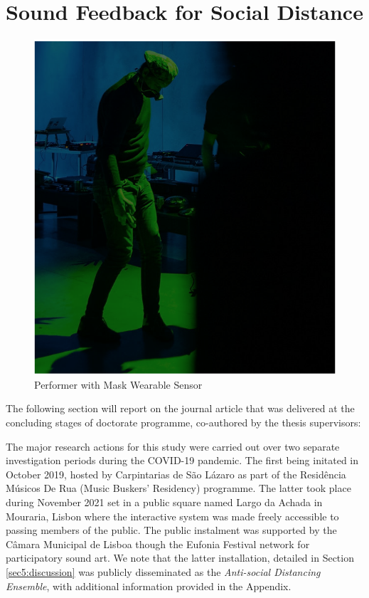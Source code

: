 
\section{Sound Feedback for Social Distance}
\label{case_studies:adse_ess}

\begin{figure}[!h]
\captionsetup{width=1.0\textwidth}
\centering
\includegraphics[width=0.75
\textwidth,keepaspectratio]{Chapters/Figures/adse_ess/CSL_MASK_MICK.png}
{\caption{Performer with Mask Wearable Sensor
}\label{fig:sensor_model}}
\end{figure}

The following section will report on the journal article that was delivered at the concluding stages of doctorate programme, co-authored by the thesis supervisors: 


The major research actions for this study were carried out over two separate investigation periods during the COVID-19 pandemic. The first being initated in October 2019, hosted by Carpintarias de São Lázaro as part of the Residência Músicos De Rua (Music Buskers' Residency) programme. The latter took place during November 2021 set in a public square named Largo da Achada in Mouraria, Lisbon where the interactive system was made freely accessible to passing members of the public. The public instalment was supported by the Câmara Municipal de Lisboa though the Eufonia Festival network for participatory sound art. We note that the latter installation, detailed in Section \ref{sec5:discussion} was publicly disseminated as the \textit{Anti-social Distancing Ensemble}, with additional information provided in the Appendix.

